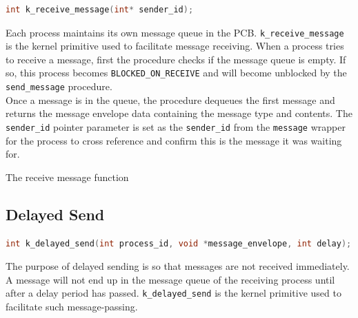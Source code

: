 \documentclass[12pt]{report}
\begin{document}
\begin{minipage}{\textwidth}
\begin{lstlisting}[language=C, frame=single]
int k_receive_message(int* sender_id);
\end{lstlisting}
\end{minipage}

Each process maintains its own message queue in the PCB. {\tt k\_receive\_message} is the kernel primitive used to facilitate message receiving. When a process tries to receive a message, first the procedure checks if the message queue is empty. If so, this process becomes {\tt BLOCKED\_ON\_RECEIVE} and will become unblocked by the {\tt send\_message} procedure. \\

Once a message is in the queue, the procedure dequeues the first message and returns the message envelope data containing the message type and contents. The {\tt sender\_id} pointer parameter is set as the {\tt sender\_id} from the {\tt message} wrapper for the process to cross reference and confirm this is the message it was waiting for. \\

\begin{algorithm}
  \caption{The receive message function}
  \begin{algorithmic}[1]
		\EndWhile
    \EndProcedure
  \end{algorithmic}
\end{algorithm}

\subsection{Delayed Send}

\begin{minipage}{\textwidth}
\begin{lstlisting}[language=C, frame=single]
int k_delayed_send(int process_id, void *message_envelope, int delay);
\end{lstlisting}
\end{minipage}

The purpose of delayed sending is so that messages are not received immediately. A message will not end up in the message queue of the receiving process until after a delay period has passed. {\tt k\_delayed\_send} is the kernel primitive used to facilitate such message-passing.\\
\end{document}
